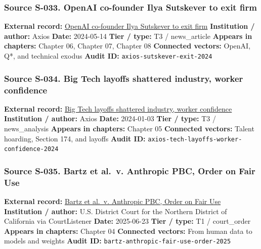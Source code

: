 \documentclass[
  american,
  11pt,
  letterpaper,
]{article}
\begin{document}
\subsubsection{Source S-033. OpenAI co-founder Ilya Sutskever to exit
firm}\label{source-s-033-openai-co-founder-ilya-sutskever-to-exit-firm}

\textbf{External record:}
\href{https://www.axios.com/2024/05/14/openai-co-founder-ilya-sutskever-leaves-company}{OpenAI
co-founder Ilya Sutskever to exit firm} \textbf{Institution / author:}
Axios \textbf{Date:} 2024-05-14 \textbf{Tier / type:} T3 / news\_article
\textbf{Appears in chapters:} Chapter 06, Chapter 07, Chapter 08
\textbf{Connected vectors:} OpenAI, Q*, and technical exodus
\textbf{Audit ID:} \texttt{axios-sutskever-exit-2024}

\subsubsection{Source S-034. Big Tech layoffs shattered industry, worker
confidence}\label{source-s-034-big-tech-layoffs-shattered-industry-worker-confidence}

\textbf{External record:}
\href{https://www.axios.com/2024/01/03/tech-layoffs-google-microsoft-employees-impact-anxiety}{Big
Tech layoffs shattered industry, worker confidence} \textbf{Institution
/ author:} Axios \textbf{Date:} 2024-01-03 \textbf{Tier / type:} T3 /
news\_analysis \textbf{Appears in chapters:} Chapter 05
\textbf{Connected vectors:} Talent hoarding, Section 174, and layoffs
\textbf{Audit ID:} \texttt{axios-tech-layoffs-worker-confidence-2024}

\subsubsection{Source S-035. Bartz et al.~v. Anthropic PBC, Order on
Fair
Use}\label{source-s-035-bartz-et-al-v-anthropic-pbc-order-on-fair-use}

\textbf{External record:}
\href{https://storage.courtlistener.com/recap/gov.uscourts.cand.434709/gov.uscourts.cand.434709.231.0_3.pdf}{Bartz
et al.~v. Anthropic PBC, Order on Fair Use} \textbf{Institution /
author:} U.S. District Court for the Northern District of California via
CourtListener \textbf{Date:} 2025-06-23 \textbf{Tier / type:} T1 /
court\_order \textbf{Appears in chapters:} Chapter 04 \textbf{Connected
vectors:} From human data to models and weights \textbf{Audit ID:}
\texttt{bartz-anthropic-fair-use-order-2025}
\end{document}
